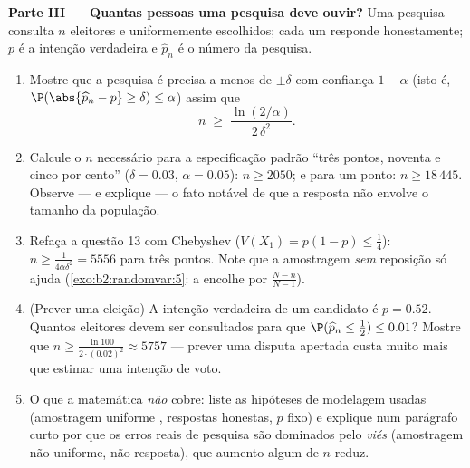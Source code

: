 \begin{problem}
\medskip
\noindent\textbf{Parte III --- Quantas pessoas uma pesquisa
deve ouvir?} Uma pesquisa consulta $n$ eleitores  e uniformemente escolhidos;
cada um responde honestamente; $p$ é a intenção verdadeira e $\widehat p_n$
é o número da pesquisa.
\begin{enumerate}[resume]
  \item Mostre que a pesquisa é precisa a menos de $\pm\delta$ com
        confiança $1 - \alpha$ (isto é,
        $\P(\abs{\widehat p_n - p} \geq \delta) \leq \alpha$)
        assim que
        \[
        n \;\geq\; \frac{\ln(2/\alpha)}{2\,\delta^2} .
        \]
  \item Calcule o $n$ necessário para a especificação padrão ``três
        pontos, noventa e cinco por cento'' ($\delta
        = 0.03$, $\alpha = 0.05$): $n \geq 2050$; e para um
        ponto: $n \geq 18\,445$. Observe --- e explique ---
        o fato notável de que a resposta não envolve
        o tamanho da população.
  \item Refaça a questão 13 com Chebyshev ($V(X_1) = p(1-p)
        \leq \frac14$): $n \geq \frac1{4\alpha\delta^2} =
        5556$ para três pontos. Note que a amostragem
        \emph{sem} reposição só ajuda
        (\cref{exo:b2:randomvar:5}: a  encolhe por
        $\frac{N-n}{N-1}$).
  \item (Prever uma eleição) A intenção verdadeira de um candidato é $p
        = 0.52$. Quantos eleitores devem ser consultados para que
        $\P(\widehat p_n \leq \tfrac12) \leq 0.01$? Mostre que $n
        \geq \frac{\ln 100}{2\cdot(0.02)^2} \approx 5757$ ---
        prever uma disputa apertada custa muito mais que estimar uma
        intenção de voto.
  \item O que a matemática \emph{não} cobre: liste as
        hipóteses de modelagem usadas (amostragem uniforme
        , respostas honestas, $p$ fixo) e explique num
        parágrafo curto por que os erros reais de pesquisa são
        dominados pelo \emph{viés} (amostragem não uniforme,
        não resposta), que aumento algum de $n$ reduz.
\end{enumerate}


\end{problem}
